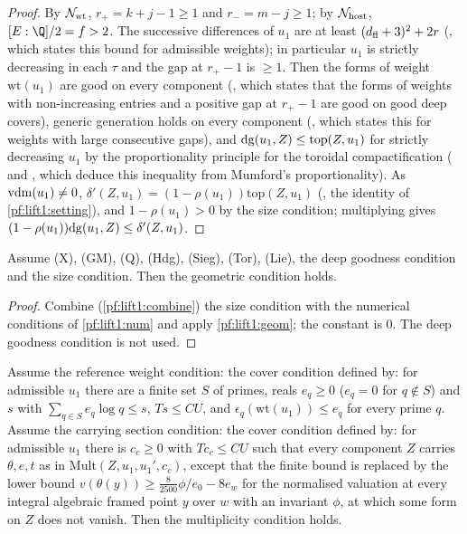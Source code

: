 \begin{proof}
By $\mathcal N_{\mathrm{wt}}$, $r_+=k+j-1\ge1$ and $r_-=m-j\ge1$; by $\mathcal N_{\mathrm{host}}$, $[E:\Q]/2=f>2$. The
successive differences of $u_1$ are at least $(d_{\mathrm{fl}}+3)^2+2r$
(, which states this bound for admissible weights); in
particular $u_1$ is strictly decreasing in each $\tau$ and the gap at $r_+-1$ is $\ge1$. Then the forms
of weight $\mathrm{wt}(u_1)$ are good on every component
(, which states that the forms of weights
with non-increasing entries and a positive gap at $r_+-1$ are good on good deep covers), generic generation
holds on every component (, which states
this for weights with large consecutive gaps), and $\mathrm{dg}(u_1,Z)\le\mathrm{top}(Z,u_1)$ for strictly
decreasing $u_1$ by the proportionality principle for the toroidal compactification
( and
, which deduce this inequality from Mumford's
proportionality). As $\mathrm{vdm}(u_1)\ne0$, $\delta'(Z,u_1)=(1-\rho(u_1))\mathrm{top}(Z,u_1)$
(, the identity of \cref{pf:lift1:setting}), and
$1-\rho(u_1)>0$ by the size condition; multiplying gives
$(1-\rho(u_1))\mathrm{dg}(u_1,Z)\le\delta'(Z,u_1)$.
\end{proof}

\begin{corollary}\label{pf:lift1:geomcond}
Assume (X), (GM), (Q), (Hdg), (Sieg), (Tor), (Lie), the deep goodness condition and the size
condition. Then the geometric condition holds.
\end{corollary}

\begin{proof}
Combine (\cref{pf:lift1:combine}) the size condition with the numerical conditions of
\cref{pf:lift1:num} and apply \cref{pf:lift1:geom}; the constant is $0$. The deep goodness condition is
not used.
\end{proof}

\begin{lemma}[Multiplicity]\label{pf:lift1:mult}
Assume the reference weight condition: the cover condition defined by: for admissible $u_1$ there are a
finite set $S$ of primes, reals $e_q\ge0$ ($e_q=0$ for $q\notin S$) and $s$ with
$\sum_{q\in S}e_q\log q\le s$, $Ts\le CU$, and $\epsilon_q(\mathrm{wt}(u_1))\le e_q$ for every
prime $q$. Assume the carrying section condition: the cover condition defined by: for admissible $u_1$
there is $c_c\ge0$ with $Tc_c\le CU$ such that every component $Z$ carries $\theta,e,t$ as in
$\mathrm{Mult}(Z,u_1,u_1',c_c)$, except that the finite bound is replaced by the lower bound
$v(\theta(y))\ge\frac8{2500}\phi/e_0-8e_w$ for the normalised valuation at every integral algebraic
framed point $y$ over $w$ with an invariant $\phi$, at which some form on $Z$ does not vanish. Then the
multiplicity condition holds.
\end{lemma}

